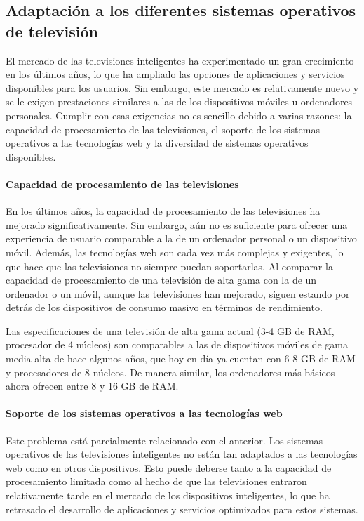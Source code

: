 \subsection{Adaptación a los diferentes sistemas operativos de televisión}
\label{sec:adaptacion}

El mercado de las televisiones inteligentes ha experimentado un gran crecimiento en los últimos años, lo que ha ampliado 
las opciones de aplicaciones y servicios disponibles para los usuarios. Sin embargo, este mercado es relativamente nuevo y 
se le exigen prestaciones similares a las de los dispositivos móviles u ordenadores personales. Cumplir con esas exigencias 
no es sencillo debido a varias razones: la capacidad de procesamiento de las televisiones, el soporte de los sistemas operativos 
a las tecnologías web y la diversidad de sistemas operativos disponibles.

\paragraph{Capacidad de procesamiento de las televisiones}
En los últimos años, la capacidad de procesamiento de las televisiones ha mejorado significativamente. Sin embargo, 
aún no es suficiente para ofrecer una experiencia de usuario comparable a la de un ordenador personal o un dispositivo móvil. 
Además, las tecnologías web son cada vez más complejas y exigentes, lo que hace que las televisiones no siempre puedan 
soportarlas. Al comparar la capacidad de procesamiento de una televisión de alta gama con la de un ordenador o un móvil, 
aunque las televisiones han mejorado, siguen estando por detrás de los dispositivos de consumo masivo en términos de rendimiento.

Las especificaciones de una televisión de alta gama actual (3-4 GB de RAM, procesador de 4 núcleos) son comparables a las de 
dispositivos móviles de gama media-alta de hace algunos años, que hoy en día ya cuentan con 6-8 GB de RAM y procesadores 
de 8 núcleos. De manera similar, los ordenadores más básicos ahora ofrecen entre 8 y 16 GB de RAM.

\paragraph{Soporte de los sistemas operativos a las tecnologías web}
Este problema está parcialmente relacionado con el anterior. Los sistemas operativos de las televisiones inteligentes no están 
tan adaptados a las tecnologías web como en otros dispositivos. Esto puede deberse tanto a la capacidad de procesamiento limitada 
como al hecho de que las televisiones entraron relativamente tarde en el mercado de los dispositivos inteligentes, lo que ha 
retrasado el desarrollo de aplicaciones y servicios optimizados para estos sistemas.

